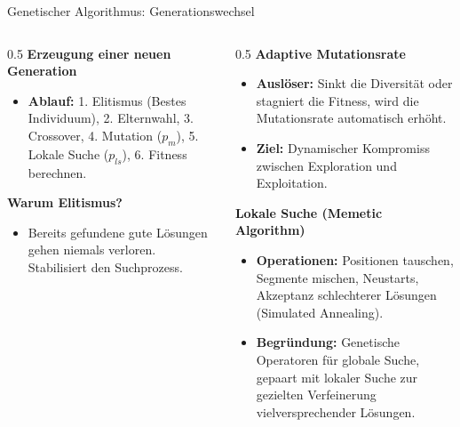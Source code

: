 \documentclass[aspectratio=169]{beamer}
\begin{document}
\begin{frame}{Genetischer Algorithmus: Generationswechsel}
\begin{columns}[T]
\footnotesize
\begin{column}{0.5\textwidth}
\textbf{Erzeugung einer neuen Generation}
\begin{itemize}
    \item \textbf{Ablauf:} 1. Elitismus (Bestes Individuum), 2. Elternwahl, 3. Crossover, 4. Mutation ($p_m$), 5. Lokale Suche ($p_{ls}$), 6. Fitness berechnen.
\end{itemize}
\textbf{Warum Elitismus?}
\begin{itemize}
    \item Bereits gefundene gute Lösungen gehen niemals verloren. Stabilisiert den Suchprozess.
\end{itemize}
\end{column}

\begin{column}{0.5\textwidth}
\textbf{Adaptive Mutationsrate}
\begin{itemize}
    \item \textcolor{HFTTeal}{\textbf{Auslöser:}} Sinkt die Diversität oder stagniert die Fitness, wird die Mutationsrate automatisch erhöht.
    \item \textcolor{HFTTeal}{\textbf{Ziel:}} Dynamischer Kompromiss zwischen Exploration und Exploitation.
\end{itemize}
\textbf{Lokale Suche (Memetic Algorithm)}
\begin{itemize}
    \item \textbf{Operationen:} Positionen tauschen, Segmente mischen, Neustarts, Akzeptanz schlechterer Lösungen (Simulated Annealing).
    \item \textcolor{HFTTeal}{\textbf{Begründung:}} Genetische Operatoren für globale Suche, gepaart mit lokaler Suche zur gezielten Verfeinerung vielversprechender Lösungen.
\end{itemize}
\end{column}
\end{columns}
\end{frame}
\end{document}
